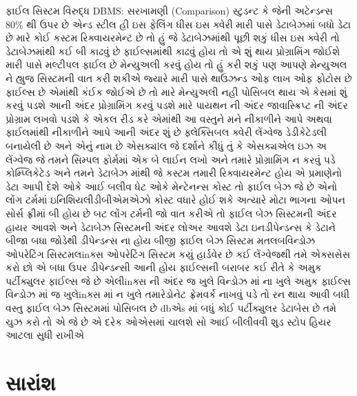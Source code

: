 \documentclass[aspectratio=169, 10pt]{beamer}
\begin{document}
\begin{frame}{ફાઈલ સિસ્ટમ વિરુદ્ધ DBMS: સરખામણી (Comparison)}
{સ્ટુડન્ટ કે જેની અટેન્ડન્સ 80\% થી ઉપર છે એન્ડ સ્ટીલ હી ઇસ ફેલિંગ ધીસ ઇસ ક્વેરી મારી પાસે ડેટાબેઝમાં બધો ડેટા છે મારે કોઈ કસ્ટમ રિક્વાયરમેન્ટ છે તો હું જે ડેટાબેઝમાંથી પૂછી શકું ધીસ ઇસ ક્વેરી તો ડેટાબેઝમાંથી કઈ બી કાઢવું છે ફાઈલ્સમાંથી કાઢવું હોય તો એ શું થાય પ્રોગ્રામિંગ જોઈશે મારી પાસે મલ્ટીપલ ફાઈલ છે મેન્યુઅલી કરવું હોય તો હું કરી શકું પણ આપણે મેન્યુઅલ ને હ્યુજ સિસ્ટમની વાત કરી શકીએ જ્યારે મારી પાસે થાઉઝન્ડ ઓફ લાખ ઓફ ફોટોસ છે ફાઈલ્સ છે એમાંથી કંઈક જોઈએ છે તો મારે મેન્યુઅલી નહી પોસિબલ થાય એ કેસમાં શું કરવું પડશે આની અંદર પ્રોગ્રામિંગ કરવું પડશે મારે પાયથન ની અંદર જાવાસ્ક્રિપ્ટ ની અંદર પ્રોગ્રામ લખવો પડશે કે એકલ રીડ કરે એમાંથી આ વસ્તુને મને નીકાળીને આપે અથવા ફાઈલમાંથી નીકાળીને આપે આની અંદર શું છે ફ્લેક્સિબલ ક્વેરી લેંગ્વેજ ડેડીકેટેડલી બનાયેલી છે અને એનું નામ છે એસક્યlલ જે દર્શાને કીધું તું કે એસક્યએલ ઇઝ અ લેંગ્વેજ જે તમને સિમ્પલ ફોર્મમાં એક બે લાઈન લખો અને તમારે પ્રોગ્રામિંગ ન કરવું પડે કોમ્પ્લિકેટેડ અને તમને ડેટાબેઝ માંથી જે કસ્ટમ તમારી રિક્વાયરમેન્ટ હોય એ પ્રમાણેનો ડેટા આપી દેશે ઓકે આઈ બલીવ ધેટ ઓકે મેન્ટેનન્સ કોસ્ટ તો ફાઈલ બેઝ જે છે એનો લોંગ ટર્મમાં ઇનિશિયલીડીબીએમએઝો કોસ્ટ વધારે હોઈ શકે અત્યારે મોટા ભાગના ઓપન સોર્સ ફ્રીમાં બી હોય છે બટ લોંગ ટર્મની જો વાત કરીએ તો ફાઈલ બેઝ સિસ્ટમની અંદર હાયર આવશે અને ડેટાબેઝ સિસ્ટમની અંદર લોઅર આવશે ડેટા ઇનડીપેન્ડન્સ કે ડેટાને બીજા બધા જોડેથી ડીપેન્ડન્સ ના હોય બીજી ફાઈલ બેઝ સિસ્ટમ મતલબવિન્ડોઝ ઓપરેટિંગ સિસ્ટમલinક્સ ઓપરેટિંગ સિસ્ટમ કયું હાર્ડવેર છે કઈ લેંગ્વેજથી તમે એક્સસેસ કરો છો એ બધા ઉપર ડીપેન્ડન્સી આની હોય ફાઈલ્સની બરાબર કઈ રીતે કે અમુક પર્ટીક્યુલર ફાઈલ્સ જે છે એલીinક્સ ની અંદર જ ખુલે વિન્ડોઝ માં ના ખુલે અમુક ફાઈલ્સ વિન્ડોઝ માં જ ખુલેinક્સ માં ન ખુલે તમારેડોનેટ ફ્રેમવર્ક નાખવું પડે તો રન થાય આવી બધી વસ્તુ ફાઈલ બેઝ સિસ્ટમમાં પોસિબલ છે dbએs માં બધું કોઈ પર્ટીક્યુલર ડેટાબેસ છે તમે ચુઝ કરો તો એ જે છે એ દરેક ઓએસમાં ચાલશે સો આઈ બીલીવવી શુડ સ્ટોપ હિયર આટલા સુધી રાખીએ
}
\end{frame}

\section{સારાંશ}
\end{document}
